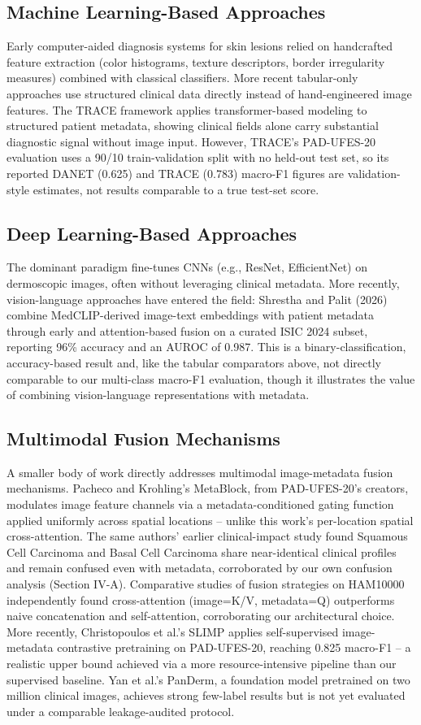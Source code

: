 \documentclass[conference]{IEEEtran}
\begin{document}
\subsection{Machine Learning-Based Approaches}
Early computer-aided diagnosis systems for skin lesions relied on handcrafted feature extraction (color histograms, texture descriptors, border irregularity measures) combined with classical classifiers. More recent tabular-only approaches use structured clinical data directly instead of hand-engineered image features. The TRACE framework applies transformer-based modeling to structured patient metadata, showing clinical fields alone carry substantial diagnostic signal without image input. However, TRACE's PAD-UFES-20 evaluation uses a 90/10 train-validation split with no held-out test set, so its reported DANET (0.625) and TRACE (0.783) macro-F1 figures are validation-style estimates, not results comparable to a true test-set score.

\subsection{Deep Learning-Based Approaches}
The dominant paradigm fine-tunes CNNs (e.g., ResNet, EfficientNet) on dermoscopic images, often without leveraging clinical metadata. More recently, vision-language approaches have entered the field: Shrestha and Palit (2026) combine MedCLIP-derived image-text embeddings with patient metadata through early and attention-based fusion on a curated ISIC 2024 subset, reporting 96\% accuracy and an AUROC of 0.987. This is a binary-classification, accuracy-based result and, like the tabular comparators above, not directly comparable to our multi-class macro-F1 evaluation, though it illustrates the value of combining vision-language representations with metadata.

\subsection{Multimodal Fusion Mechanisms}
A smaller body of work directly addresses multimodal image-metadata fusion mechanisms. Pacheco and Krohling's MetaBlock, from PAD-UFES-20's creators, modulates image feature channels via a metadata-conditioned gating function applied uniformly across spatial locations -- unlike this work's per-location spatial cross-attention. The same authors' earlier clinical-impact study found Squamous Cell Carcinoma and Basal Cell Carcinoma share near-identical clinical profiles and remain confused even with metadata, corroborated by our own confusion analysis (Section IV-A). Comparative studies of fusion strategies on HAM10000 independently found cross-attention (image=K/V, metadata=Q) outperforms naive concatenation and self-attention, corroborating our architectural choice. More recently, Christopoulos et al.'s SLIMP applies self-supervised image-metadata contrastive pretraining on PAD-UFES-20, reaching 0.825 macro-F1 -- a realistic upper bound achieved via a more resource-intensive pipeline than our supervised baseline. Yan et al.'s PanDerm, a foundation model pretrained on two million clinical images, achieves strong few-label results but is not yet evaluated under a comparable leakage-audited protocol.
\end{document}
